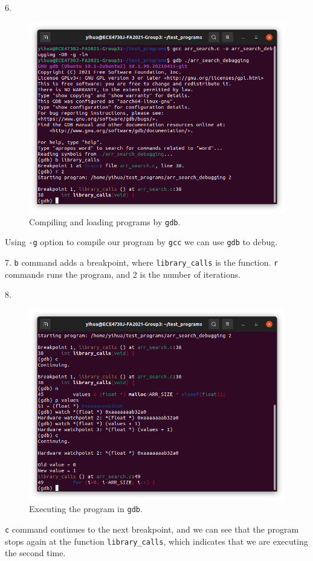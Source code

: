 \documentclass[a4paper]{article}
\begin{document}
6.
\begin{figure}[H]
    \centering
    \includegraphics[width=1\textwidth]{6.png}
    \caption{Compiling and loading programs by \texttt{gdb}.}
\end{figure}
Using \texttt{-g} option to compile our program by \texttt{gcc} we can use \texttt{gdb} to debug.

7. \texttt{b} command adds a breakpoint, where \texttt{library\_calls} is the function. \texttt{r} commands runs the program, and 2 is the number of iterations.

8.
\begin{figure}[H]
    \centering
    \includegraphics[width=1\textwidth]{7.png}
    \caption{Executing the program in \texttt{gdb}.}
\end{figure}
\texttt{c} command continues to the next breakpoint, and we can see that the program stops again at the function \texttt{library\_calls}, which indicates that we are executing the second time.
\end{document}
